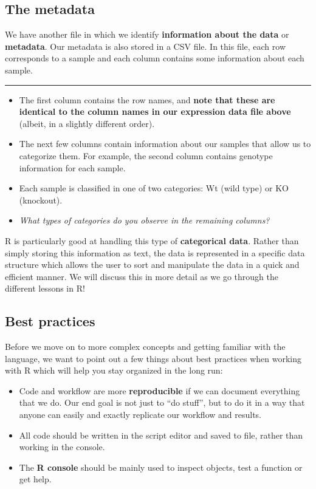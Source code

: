 \documentclass[
]{article}
\providecommand{\tightlist}{%
  \setlength{\itemsep}{0pt}\setlength{\parskip}{0pt}}
\begin{document}
\hypertarget{the-metadata}{%
\subsection{The metadata}\label{the-metadata}}

We have another file in which we identify \textbf{information about the
data} or \textbf{metadata}. Our metadata is also stored in a CSV file.
In this file, each row corresponds to a sample and each column contains
some information about each sample.

\begin{center}\rule{0.5\linewidth}{0.5pt}\end{center}

\begin{itemize}
\tightlist
\item
  The first column contains the row names, and \textbf{note that these
  are identical to the column names in our expression data file above}
  (albeit, in a slightly different order).
\item
  The next few columns contain information about our samples that allow
  us to categorize them. For example, the second column contains
  genotype information for each sample.
\item
  Each sample is classified in one of two categories: Wt (wild type) or
  KO (knockout).
\item
  \emph{What types of categories do you observe in the remaining
  columns?}
\end{itemize}

R is particularly good at handling this type of \textbf{categorical
data}. Rather than simply storing this information as text, the data is
represented in a specific data structure which allows the user to sort
and manipulate the data in a quick and efficient manner. We will discuss
this in more detail as we go through the different lessons in R!

\hypertarget{best-practices}{%
\subsection{Best practices}\label{best-practices}}

Before we move on to more complex concepts and getting familiar with the
language, we want to point out a few things about best practices when
working with R which will help you stay organized in the long run:

\begin{itemize}
\item
  Code and workflow are more \textbf{reproducible} if we can document
  everything that we do. Our end goal is not just to ``do stuff'', but
  to do it in a way that anyone can easily and exactly replicate our
  workflow and results.
\item
  All code should be written in the script editor and saved to file,
  rather than working in the console.
\item
  The \textbf{R console} should be mainly used to inspect objects, test
  a function or get help.
\end{itemize}
\end{document}
